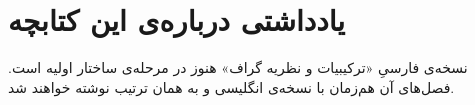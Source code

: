 \chapter*{یادداشتی درباره‌ی این کتابچه}

نسخه‌ی فارسیِ «ترکیبیات و نظریه گراف» هنوز در مرحله‌ی ساختار اولیه است. فصل‌های آن هم‌زمان با نسخه‌ی انگلیسی و به همان ترتیب نوشته خواهند شد.
